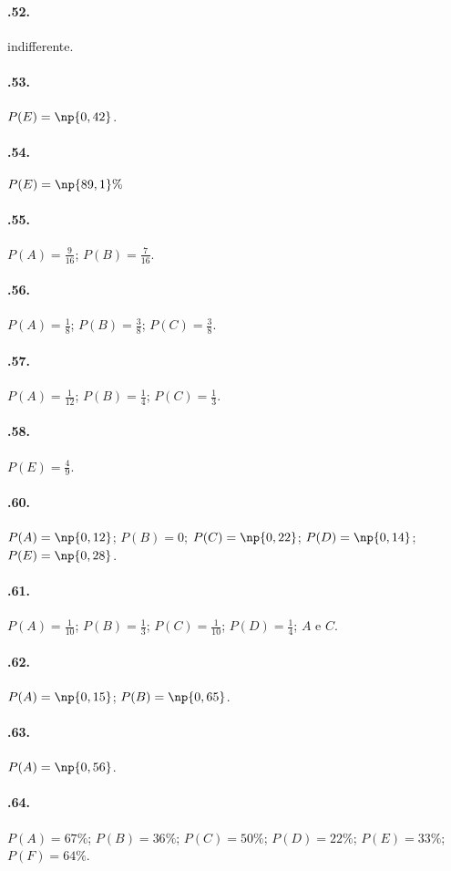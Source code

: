 \begin{multicols}{2}
\paragraph{\thechapter.52.} indifferente.

\paragraph{\thechapter.53.} $P(E)=\np{0,42}$.

\paragraph{\thechapter.54.} $P(E)=\np{89,1}\%$

\paragraph{\thechapter.55.} $ P(A)=\frac 9 {16}$; $P(B)=\frac 7 {16} $.

\paragraph{\thechapter.56.} $ P(A)=\frac 1 8$; $P(B)=\frac3 8$; $P(C)=\frac 3 8 $.

\paragraph{\thechapter.57.} $ P(A)=\frac 1 {12}$; $P(B)=\frac1 4$; $P(C)=\frac 1 3 $.

\paragraph{\thechapter.58.} $ P(E)=\frac 4 9 $.

\paragraph{\thechapter.60.} $P(A)=\np{0,12}$; $P(B)=0$; $P(C)=\np{0,22}$; $P(D)=\np{0,14}$; $P(E)=\np{0,28}$.

\paragraph{\thechapter.61.} $ P(A)=\frac 1{10}$; $ P(B)=\frac 1 3 $; $ P(C)=\frac 1{10} $; $ P(D)=\frac 1 4 $; $A$ e $C$.

\paragraph{\thechapter.62.} $P(A)=\np{0,15}$; $P(B)=\np{0,65}$.

\paragraph{\thechapter.63.} $P(A)=\np{0,56}$.

\paragraph{\thechapter.64.} $P(A)=67\%$; $P(B)=36\%$; $P(C)=50\%$; $P(D)=22\%$; $P(E)=33\%$; $P(F)=64\%$.
\end{multicols}
